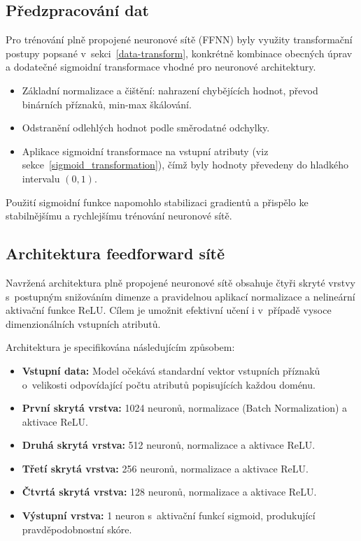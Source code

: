 \subsection{Předzpracování dat}

Pro trénování plně propojené neuronové sítě (FFNN) byly využity transformační postupy popsané v~sekci~\ref{data-transform}, konkrétně kombinace obecných úprav a dodatečné sigmoidní transformace vhodné pro neuronové architektury.

\begin{itemize}
    \item Základní normalizace a čištění: nahrazení chybějících hodnot, převod binárních příznaků, min-max škálování.
    \item Odstranění odlehlých hodnot podle směrodatné odchylky.
    \item Aplikace sigmoidní transformace na vstupní atributy (viz sekce~\ref{sigmoid_transformation}), čímž byly hodnoty převedeny do hladkého intervalu $(0,1)$.
\end{itemize}

Použití sigmoidní funkce napomohlo stabilizaci gradientů a přispělo ke stabilnějšímu a rychlejšímu trénování neuronové sítě.

\subsection{Architektura feedforward sítě}

Navržená architektura plně propojené neuronové sítě obsahuje čtyři skryté vrstvy s~postupným snižováním dimenze a pravidelnou aplikací normalizace a nelineární aktivační funkce ReLU. Cílem je umožnit efektivní učení i v~případě vysoce dimenzionálních vstupních atributů.

Architektura je specifikována následujícím způsobem:
\begin{itemize}
    \item \textbf{Vstupní data:} Model očekává standardní vektor vstupních příznaků o~velikosti odpovídající počtu atributů popisujících každou doménu.
    \item \textbf{První skrytá vrstva:} 1024 neuronů, normalizace (Batch Normalization) a aktivace ReLU.
    \item \textbf{Druhá skrytá vrstva:} 512 neuronů, normalizace a aktivace ReLU.
    \item \textbf{Třetí skrytá vrstva:} 256 neuronů, normalizace a aktivace ReLU.
    \item \textbf{Čtvrtá skrytá vrstva:} 128 neuronů, normalizace a aktivace ReLU.
    \item \textbf{Výstupní vrstva:} 1 neuron s~aktivační funkcí sigmoid, produkující pravděpodobnostní skóre.
\end{itemize}

